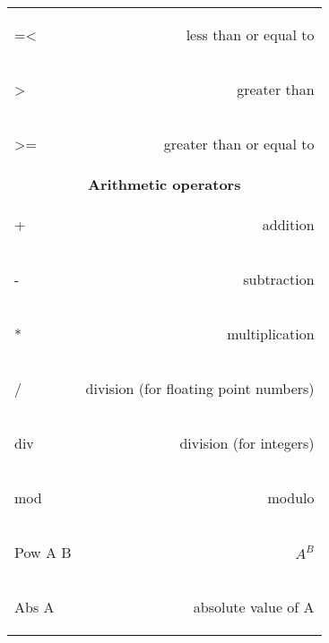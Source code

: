 \documentclass[12pt]{article}
\begin{document}
\begin{multicols}{2}
\begin{tabular}{l r}
\begin{oz}
 =<
\end{oz}
 &less than or equal to\\
 
\begin{oz}
 >
\end{oz}
 &greater than\\
 
\begin{oz}
 >=
\end{oz}
 &greater than or equal to\\


\multicolumn{2}{c}{\textbf{Arithmetic operators}}\\
\begin{oz}
 +
\end{oz}
 &addition\\
 
\begin{oz}
 -
\end{oz}
 &subtraction\\
 
\begin{oz}
 *
\end{oz}
 &multiplication\\
 
\begin{oz}
 /
\end{oz}
 &division (for floating point numbers)\\
 
\begin{oz}
 div
\end{oz}
 &division (for integers)\\
 
\begin{oz}
 mod
\end{oz}
 &modulo\\
 
\begin{oz}
 {Pow A B}
\end{oz}
 &$A^{B}$\\
 
 \begin{oz}
 {Abs A}
\end{oz}
 &absolute value of A\\



 








\end{tabular}




\end{multicols}
\end{document}
